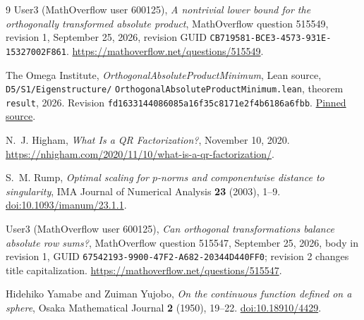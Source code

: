 \documentclass[11pt]{article}
\begin{document}
\begin{thebibliography}{9}
User3 (MathOverflow user 600125),
\emph{A nontrivial lower bound for the orthogonally transformed absolute product},
MathOverflow question 515549, revision 1, September 25, 2026,
revision GUID \texttt{CB719581-BCE3-4573-931E-15327002F861}.
\url{https://mathoverflow.net/questions/515549}.

The Omega Institute, \emph{OrthogonalAbsoluteProductMinimum},
Lean source, \texttt{D5/S1/Eigenstructure/}\allowbreak
\texttt{OrthogonalAbsoluteProductMinimum.lean},
theorem \texttt{result}, 2026.
Revision \texttt{fd1633144086085a16f35c8171e2f4b6186a6fbb}.
\href{https://github.com/the-omega-institute/trureturing/blob/fd1633144086085a16f35c8171e2f4b6186a6fbb/D5/S1/Eigenstructure/OrthogonalAbsoluteProductMinimum.lean}{Pinned source}.

N.~J. Higham, \emph{What Is a QR Factorization?}, November 10, 2020.
\url{https://nhigham.com/2020/11/10/what-is-a-qr-factorization/}.

S.~M. Rump, \emph{Optimal scaling for $p$-norms and componentwise distance
to singularity}, IMA Journal of Numerical Analysis \textbf{23} (2003), 1--9.
\href{https://doi.org/10.1093/imanum/23.1.1}{doi:10.1093/imanum/23.1.1}.

User3 (MathOverflow user 600125),
\emph{Can orthogonal transformations balance absolute row sums?},
MathOverflow question 515547, September 25, 2026,
body in revision 1, GUID \texttt{67542193-9900-47F2-A682-20344D440FF0};
revision 2 changes title capitalization.
\url{https://mathoverflow.net/questions/515547}.

Hidehiko Yamabe and Zuiman Yujobo, \emph{On the continuous function defined on a
sphere}, Osaka Mathematical Journal \textbf{2} (1950), 19--22.
\href{https://doi.org/10.18910/4429}{doi:10.18910/4429}.
\end{thebibliography}
\end{document}

